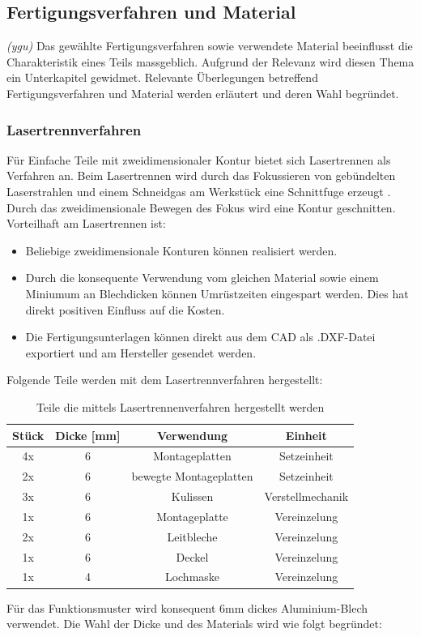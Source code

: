 \subsection{Fertigungsverfahren und Material}
\textit{(ygu)} Das gewählte Fertigungsverfahren sowie verwendete Material beeinflusst die Charakteristik eines Teils massgeblich. Aufgrund der Relevanz wird diesen Thema ein Unterkapitel gewidmet. Relevante Überlegungen betreffend Fertigungsverfahren und Material werden erläutert und deren Wahl begründet.

\subsubsection{Lasertrennverfahren}
Für Einfache Teile mit zweidimensionaler Kontur bietet sich Lasertrennen als Verfahren an. Beim Lasertrennen wird durch das Fokussieren von gebündelten Laserstrahlen und einem Schneidgas am Werkstück eine Schnittfuge erzeugt \cite{laser}. Durch das zweidimensionale Bewegen des Fokus wird eine Kontur geschnitten. Vorteilhaft am Lasertrennen ist:

\begin{itemize}
	\item Beliebige zweidimensionale Konturen können realisiert werden.
	
	\item Durch die konsequente Verwendung vom gleichen Material sowie einem Miniumum an Blechdicken können Umrüstzeiten eingespart werden. Dies hat direkt positiven Einfluss auf die Kosten.
	
	\item Die Fertigungsunterlagen können direkt aus dem CAD als .DXF-Datei exportiert und am Hersteller gesendet werden. 
\end{itemize}
Folgende Teile werden mit dem Lasertrennverfahren hergestellt:

\begin{table}[H]
\begin{tabular}{|c|c|c|c|}
	\hline 
	Stück & Dicke [mm] & Verwendung & Einheit \\ 
	\hline 
	4x & 6 &Montageplatten & Setzeinheit \\ 
	\hline 
	2x & 6 & bewegte Montageplatten & Setzeinheit \\ 
	\hline 
	3x & 6 & Kulissen & Verstellmechanik \\ 
	\hline 
	1x & 6 & Montageplatte & Vereinzelung \\ 
	\hline 
	2x & 6 & Leitbleche  & Vereinzelung \\ 
	\hline 
	1x & 6 & Deckel & Vereinzelung \\ 
	\hline 
	1x & 4 & Lochmaske & Vereinzelung  \\ 
	\hline 
\end{tabular}
	\caption{Teile die mittels Lasertrennenverfahren hergestellt werden}
	\label{tab:lasertrennen}
\end{table} 
Für das Funktionsmuster wird konsequent 6mm dickes Aluminium-Blech verwendet. Die Wahl der Dicke und des Materials wird wie folgt begründet:


